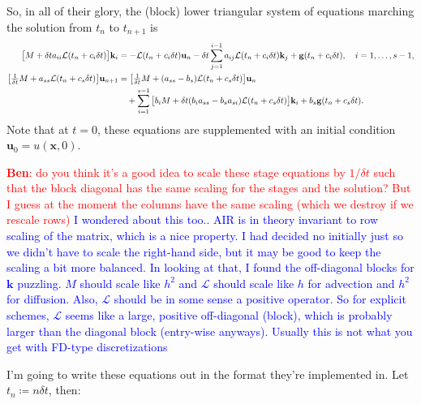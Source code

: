 \documentclass[a4paper,10pt]{article}
\newcommand{\tcb}{\textcolor{blue}}
\begin{document}
So, in all of their glory, the (block) lower triangular system of equations marching the solution from $t_n$ to $t_{n+1}$ is
\begin{align} \label{eq:time_step_w_stages}
\begin{split}
\big[ M + \delta t a_{ii} {\cal L}(t_n + c_i \delta t) \big] \mathbf{k}_i 
&= 
- {\cal L}(t_n + c_i \delta t) \mathbf{u}_{n} 
- \delta t \sum \limits_{j = 1}^{i-1} a_{ij} {\cal L}(t_n + c_i \delta t) \mathbf{k}_{j} 
+ \mathbf{g}(t_n + c_i \delta t),
\quad
i = 1,\ldots,s-1, \\
\big[ 
\tfrac{1}{\delta t} M + a_{ss} {\cal L}(t_n + c_s \delta t) 
\big] 
\mathbf{u}_{n+1} 
&= 
\big[ 
\tfrac{1}{\delta t} M + ( a_{ss} - b_s) {\cal L}(t_n + c_s \delta t) 
\big] 
\mathbf{u}_{n} \\
&\quad
+ \sum \limits_{i = 1}^{s-1} 
\big[
b_i M + \delta t  (b_i a_{ss} - b_s a_{si}) {\cal L}(t_n + c_s \delta t)
\big] \mathbf{k}_i
+
b_s \mathbf{g}(t_n + c_s \delta t).
\end{split}
\end{align}
Note that at $t = 0$, these equations are supplemented with an initial condition $\mathbf{u}_0 = u(\mathbf{x},0)$.

\textcolor{red}{\textbf{Ben}: do you think it's a good idea to scale these stage equations by $1/\delta t$ such that the block diagonal has the same scaling for the stages and the solution? But I guess at the moment the columns have the same scaling (which we destroy if we rescale rows)}
\tcb{I wondered about this too.. AIR is in theory invariant to row scaling of the matrix, which is a nice property. I
had decided no initially just so we didn't have to scale the right-hand side, but it may be good to keep the scaling
a bit more balanced. 
In looking at that, I found the off-diagonal blocks for $\mathbf{k}$ puzzling. $M$ should scale like $h^2$ and 
$\mathcal{L}$ should scale like $h$ for advection and $h^2$ for diffusion. Also, $\mathcal{L}$ should be in some
sense a positive operator. So for explicit schemes, $\mathcal{L}$ seems like a large, positive off-diagonal (block), which is
probably larger than the diagonal block (entry-wise anyways). Usually this is not what you get with FD-type
discretizations}


I'm going to write these equations out in the format they're implemented in. Let $t_n \coloneqq n \delta t$, then:
\end{document}
